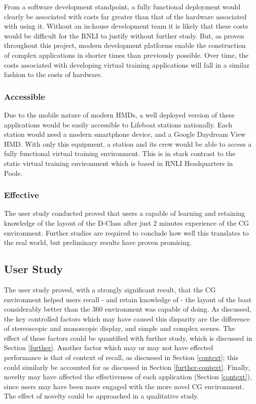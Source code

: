 \documentclass[ %
                    author={Elis Jones},
                supervisor={Dr. Kirsten Cater},
                    degree={BSc},
                     title={The Effect of Presentation Medium on Spatial Cognition},
                  subtitle={in the Virtual Environment},
                      year={2018} ]{dissertation}
\begin{document}
From a software development standpoint, a fully functional deployment would clearly be associated with costs far greater than that of the hardware associated with using it. Without an in-house development team it is likely that these costs would be difficult for the RNLI to justify without further study. But, as proven throughout this project, modern development platforms enable the construction of complex applications in shorter times than previously possible. Over time, the costs associated with developing virtual training applications will fall in a similar fashion to the costs of hardware.

\subsubsection{Accessible}
Due to the mobile nature of modern HMDs, a well deployed version of these applications would be easily accessible to Lifeboat stations nationally. Each station would need a modern smartphone device, and a Google Daydream View HMD. With only this equipment, a station and its crew would be able to access a fully functional virtual training environment. This is in stark contrast to the static virtual training environment which is based in RNLI Headquarters in Poole. 

\subsubsection{Effective}
The user study conducted proved that users a capable of learning and retaining knowledge of the layout of the D-Class after just 2 minutes experience of the CG environment. Further studies are required to conclude how well this translates to the real world, but preliminary results have proven promising. 

\subsection{User Study}
The user study proved, with a strongly significant result, that the CG environment helped users recall - and retain knowledge of - the layout of the boat considerably better than the 360 environment was capable of doing. As discussed, the key controlled factors which may have caused this disparity are the difference of stereoscopic and monoscopic display, and simple and complex scenes. The effect of these factors could be quantified with further study, which is discussed in Section \ref{further}. Another factor which may or may not have effected performance is that of context of recall, as discussed in Section \ref{context}; this could similarly be accounted for as discussed in Section \ref{further-context}. Finally, novelty may have affected the effectiveness of each application (Section \ref{context}), since users may have been more engaged with the more novel CG environment. The effect of novelty could be approached in a qualitative study. 
\end{document}
